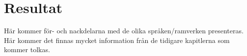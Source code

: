 \section{Resultat}
\label{sec:alexander-results}

Här kommer för- och nackdelarna med de olika språken/ramverken presenteras. Här kommer det finnas mycket information från de tidigare kapitlerna som kommer tolkas. 